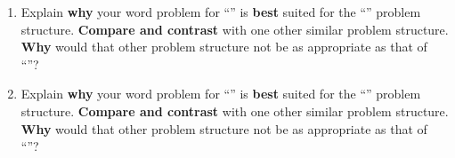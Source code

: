 \begin{enumerate}

    \item Explain \textbf{why} your word problem for ``'' is \textbf{best} suited for the ``'' problem structure. \textbf{Compare and contrast} with one other similar problem structure. \textbf{Why} would that other problem structure not be as appropriate as that of ``''?

    \vfill

    \item Explain \textbf{why} your word problem for ``'' is \textbf{best} suited for the ``'' problem structure. \textbf{Compare and contrast} with one other similar problem structure. \textbf{Why} would that other problem structure not be as appropriate as that of ``''?

    \vfill

\end{enumerate}

